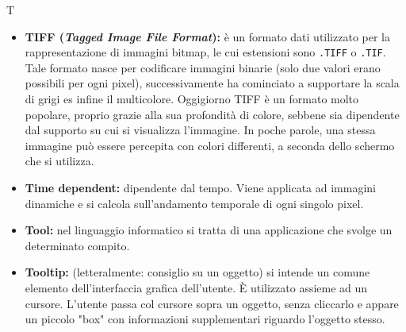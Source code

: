 \Huge T
\normalsize
\begin{itemize}
\item\textbf{TIFF (\textit{Tagged Image File Format}):} è un formato dati utilizzato per la rappresentazione di immagini bitmap\glossario{}, le cui estensioni sono \verb!.TIFF! o \verb!.TIF!. Tale formato nasce per codificare immagini binarie (solo due valori erano possibili per ogni pixel\glossario{}), successivamente ha cominciato a supportare la scala di grigi es infine il multicolore. Oggigiorno TIFF è un formato molto popolare, proprio grazie alla sua profondità di colore, sebbene sia dipendente dal supporto su cui si visualizza l'immagine. In poche parole, una stessa immagine può essere percepita con colori differenti, a seconda dello schermo che si utilizza.

\item\textbf{Time dependent:} dipendente dal tempo. Viene applicata ad immagini dinamiche e si calcola sull'andamento temporale di ogni singolo pixel\glossario{}.

\item \textbf{Tool:} nel linguaggio informatico si tratta di una applicazione che svolge un determinato compito.

\item \textbf{Tooltip:} (letteralmente: consiglio su un oggetto) si intende un comune elemento dell'interfaccia grafica dell'utente. È utilizzato assieme ad un cursore. L'utente passa col cursore sopra un oggetto, senza cliccarlo e appare un piccolo "box" con informazioni supplementari riguardo l'oggetto stesso.
\end{itemize}
\pagebreak